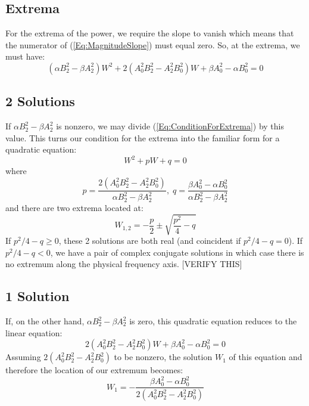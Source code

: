 \subsection{Extrema}
For the extrema of the power, we require the slope to vanish which means that the numerator of (\ref{Eq:MagnitudeSlope}) must equal zero. So, at the extrema, we must have:
\begin{equation}
\label{Eq:ConditionForExtrema}
 (\alpha B_2^2-\beta A_2^2)W^2 + 2(A_0^2 B_2^2-A_2^2 B_0^2)W + \beta A_0^2 - \alpha B_0^2 = 0  
\end{equation}

\subsection{2 Solutions}
If $\alpha B_2^2-\beta A_2^2$ is nonzero, we may divide (\ref{Eq:ConditionForExtrema}) by this value. This turns our condition for the extrema into the familiar form for a quadratic equation:
\begin{equation}
 W^2 + p W + q = 0  
\end{equation}
where
\begin{equation}
 p = \frac{2(A_0^2 B_2^2-A_2^2 B_0^2)}{\alpha B_2^2-\beta A_2^2}, \;
 q = \frac{\beta A_0^2 - \alpha B_0^2}{\alpha B_2^2-\beta A_2^2}
\end{equation}
and there are two extrema located at:
\begin{equation}
 W_{1,2} = -\frac{p}{2} \pm \sqrt{\frac{p^2}{4} - q} 
\end{equation}
If $p^2/4 - q \geq 0$, these 2 solutions are both real (and coincident if $p^2/4 - q = 0$). If $p^2/4 - q < 0$, we have a pair of complex conjugate solutions in which case there is no extremum along the physical frequency axis. [VERIFY THIS]

\subsection{1 Solution}
If, on the other hand, $\alpha B_2^2-\beta A_2^2$ is zero, this quadratic equation reduces to the linear equation:
\begin{equation}
 2(A_0^2 B_2^2-A_2^2 B_0^2)W + \beta A_0^2 - \alpha B_0^2 = 0  
\end{equation}
Assuming $2(A_0^2 B_2^2-A_2^2 B_0^2)$ to be nonzero, the solution $W_1$ of this equation and therefore the location of our extremum becomes:
\begin{equation}
 W_1 = -\frac{\beta A_0^2 - \alpha B_0^2}{2(A_0^2 B_2^2-A_2^2 B_0^2)} 
\end{equation}

